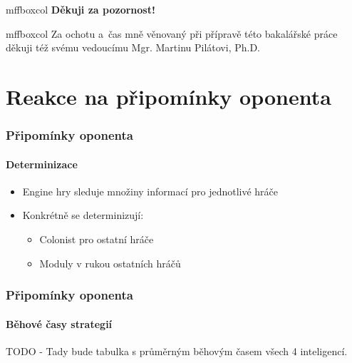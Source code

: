 \documentclass[c, 10pt]{beamer}
\begin{document}
\begin{frame}[plain]         %

\begin{beamercolorbox}[center, sep=2pt, rounded=true, shadow=true]{mffboxcol}
\LARGE\bfseries \alert{Děkuji za pozornost!}
\end{beamercolorbox}

\vspace{5em}
\begin{beamercolorbox}[center, sep=2pt, rounded=true, shadow=true]{mffboxcol}
Za ochotu a~čas mně věnovaný při přípravě této bakalářské práce děkuji též svému vedoucímu \alert{Mgr. Martinu Pilátovi, Ph.D.}
\end{beamercolorbox}
\end{frame}


\section{Reakce na připomínky oponenta}

\begin{frame}\frametitle{Připomínky oponenta}
\framesubtitle{Determinizace}
    \begin{itemize}\itemsep=1ex
        \item Engine hry sleduje množiny informací pro jednotlivé hráče
        \item Konkrétně se determinizují:
            \begin{itemize}\color{colTwo}\itemsep=1ex
                \item Colonist pro ostatní hráče
                \item Moduly v rukou ostatních hráčů
            \end{itemize}
    \end{itemize}
\end{frame}

\begin{frame}\frametitle{Připomínky oponenta}
\framesubtitle{Běhové časy strategií}
    TODO - 
    Tady bude tabulka s průměrným běhovým časem všech 4 inteligencí.
\end{frame}
\end{document}
